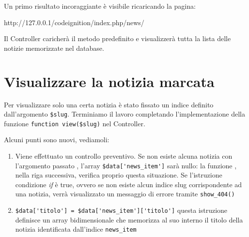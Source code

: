 
Un primo risultato incoraggiante è visibile ricaricando la pagina:

\begin{code}
http://127.0.0.1/codeignition/index.php/news/
\end{code}

Il Controller caricherà il metodo predefinito e visualizzerà tutta la lista delle notizie memorizzate nel database. 

\section*{Visualizzare la notizia marcata}
Per visualizzare solo una certa notizia è stato fissato un indice definito dall'argomento \verb|$slug|. Terminiamo il lavoro completando l'implementazione della funzione \verb|function view($slug)| nel Controller.


Alcuni punti sono nuovi, vediamoli:

\begin{enumerate}
\item Viene effettuato un controllo preventivo. Se non esiste alcuna notizia con l'argomento passato , l'array \verb|$data['news_item']| sarà nullo: la funzione , nella riga successiva, verifica proprio questa situazione. Se l'istruzione condizione \textit{if} è true, ovvero se non esiste alcun indice slug corrispondente ad una notizia, verrà visualizzato un messaggio di errore tramite \verb|show_404()|
\item \verb|$data['titolo'] = $data['news_item']['titolo']| questa istruzione definisce un array bidimensionale che memorizza al suo interno il titolo della notizia identificata dall'indice \verb|news_item|
\end{enumerate}

